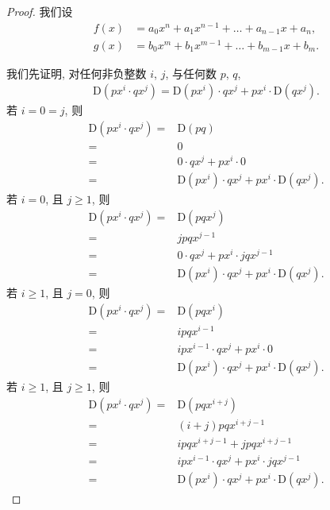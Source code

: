 \documentclass[../libro.tex]{subfiles}
\begin{document}
\begin{proof}
    我们设
    \begin{align*}
        f(x) & = a_0 x^n + a_1 x^{n-1} + \dots + a_{n-1} x + a_n, \\
        g(x) & = b_0 x^m + b_1 x^{m-1} + \dots + b_{m-1} x + b_m.
    \end{align*}

    我们先证明, 对任何非负整数 \(i\), \(j\),
    与任何数 \(p\), \(q\),
    \begin{align*}
        \mathrm{D} (p x^i \cdot q x^j)
        = \mathrm{D} (p x^i) \cdot q x^j
        + p x^i \cdot \mathrm{D} (q x^j).
    \end{align*}
    若 \(i = 0 = j\), 则
    \begin{align*}
        \mathrm{D} (p x^i \cdot q x^j)
        = {} &
        \mathrm{D} (p q)
        \\
        = {} &
        0
        \\
        = {} &
        0 \cdot q x^j + p x^i \cdot 0
        \\
        = {} &
        \mathrm{D} (p x^i) \cdot q x^j
        + p x^i \cdot \mathrm{D} (q x^j).
    \end{align*}
    若 \(i = 0\), 且 \(j \geq 1\), 则
    \begin{align*}
        \mathrm{D} (p x^i \cdot q x^j)
        = {} &
        \mathrm{D} (p q x^j)
        \\
        = {} &
        j p q x^{j-1}
        \\
        = {} &
        0 \cdot q x^j + p x^i \cdot j q x^{j-1}
        \\
        = {} &
        \mathrm{D} (p x^i) \cdot q x^j
        + p x^i \cdot \mathrm{D} (q x^j).
    \end{align*}
    若 \(i \geq 1\), 且 \(j = 0\), 则
    \begin{align*}
        \mathrm{D} (p x^i \cdot q x^j)
        = {} &
        \mathrm{D} (p q x^i)
        \\
        = {} &
        i p q x^{i-1}
        \\
        = {} &
        i p x^{i-1} \cdot q x^j + p x^i \cdot 0
        \\
        = {} &
        \mathrm{D} (p x^i) \cdot q x^j
        + p x^i \cdot \mathrm{D} (q x^j).
    \end{align*}
    若 \(i \geq 1\), 且 \(j \geq 1\), 则
    \begin{align*}
        \mathrm{D} (p x^i \cdot q x^j)
        = {} &
        \mathrm{D} (p q x^{i+j})
        \\
        = {} &
        (i + j) p q x^{i+j-1}
        \\
        = {} &
        i p q x^{i+j-1} + j p q x^{i+j-1}
        \\
        = {} &
        i p x^{i-1} \cdot q x^j + p x^i \cdot j q x^{j-1}
        \\
        = {} &
        \mathrm{D} (p x^i) \cdot q x^j
        + p x^i \cdot \mathrm{D} (q x^j).
    \end{align*}


\end{proof}
\end{document}
